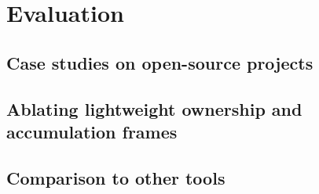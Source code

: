 \section{Evaluation}

\subsection{Case studies on open-source projects}
\label{sec:case-studies}

\subsection{Ablating lightweight ownership and accumulation frames}
\label{sec:ablation}

\subsection{Comparison to other tools}
\label{sec:compare}
